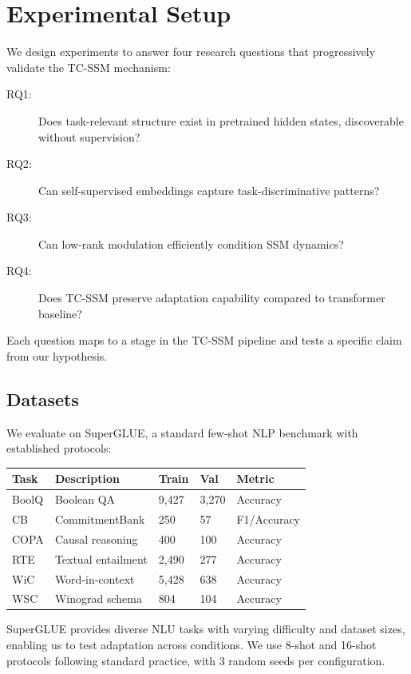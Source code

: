 \section{Experimental Setup}

We design experiments to answer four research questions that progressively validate the TC-SSM mechanism:

\begin{description}
\item[RQ1:] Does task-relevant structure exist in pretrained hidden states, discoverable without supervision?
\item[RQ2:] Can self-supervised embeddings capture task-discriminative patterns?
\item[RQ3:] Can low-rank modulation efficiently condition SSM dynamics?
\item[RQ4:] Does TC-SSM preserve adaptation capability compared to transformer baseline?
\end{description}

Each question maps to a stage in the TC-SSM pipeline and tests a specific claim from our hypothesis.

\subsection{Datasets}

We evaluate on SuperGLUE, a standard few-shot NLP benchmark with established protocols:

\begin{table}[h]
\centering
\begin{tabular}{@{}lllll@{}}
\toprule
Task & Description & Train & Val & Metric \\
\midrule
BoolQ & Boolean QA & 9,427 & 3,270 & Accuracy \\
CB & CommitmentBank & 250 & 57 & F1/Accuracy \\
COPA & Causal reasoning & 400 & 100 & Accuracy \\
RTE & Textual entailment & 2,490 & 277 & Accuracy \\
WiC & Word-in-context & 5,428 & 638 & Accuracy \\
WSC & Winograd schema & 804 & 104 & Accuracy \\
\bottomrule
\end{tabular}
\end{table}

SuperGLUE provides diverse NLU tasks with varying difficulty and dataset sizes, enabling us to test adaptation across conditions. We use 8-shot and 16-shot protocols following standard practice, with 3 random seeds per configuration.

